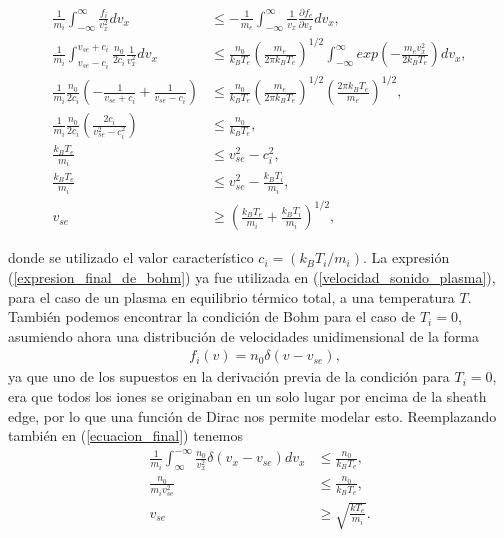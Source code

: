 \documentclass[../main.tex]{subfiles}
\begin{document}
{        \begin{align}
        \frac{1}{m_i} \int_{-\infty}^{\infty} \frac{f_i}{v_x^2}dv_x 
        &\leq  -\frac{1}{m_e} \int_{-\infty}^{\infty} \frac{1}{v_x}\frac{\partial f_e}{\partial v_x} dv_x, \\
        \frac{1}{m_i} \int_{v_{se}-c_i}^{v_{se}+c_i} \frac{n_0}{2c_i}\frac{1}{v_x^2}dv_x &\leq \frac{n_0}{k_BT_e}\left(\frac{m_e}{2\pi k_BT_e}\right)^{1/2}\int_{-\infty}^{\infty} exp\left(-\frac{m_ev_x^2}{2k_BT_e}\right) dv_x, \\
        \frac{1}{m_i} \frac{n_0}{2c_i}\left(-\frac{1}{v_{se}+c_i}+\frac{1}{v_{se}-c_i}\right) &\leq \frac{n_0}{k_BT_e}\left(\frac{m_e}{2\pi k_BT_e}\right)^{1/2}\left(\frac{2\pi k_BT_e}{m_e}\right)^{1/2}, \\
        \frac{1}{m_i} \frac{n_0}{2c_i}\left(\frac{2c_i}{v_{se}^2-c_i^2}\right) &\leq \frac{n_0}{k_BT_e}, \\
        \frac{k_BT_e}{m_i}  &\leq v_{se}^2-c_i^2, \\
        \frac{k_BT_e}{m_i}  &\leq v_{se}^2-\frac{k_BT_i}{m_i}, \\
        v_{se} &\geq \left(\frac{k_BT_e}{m_i} + \frac{k_BT_i}{m_i}\right)^{1/2}, \label{expresion_final_de_bohm}
    \end{align}
  
  donde se utilizado el valor característico $c_i = \left(k_BT_i/m_i\right)$. La expresión (\ref{expresion_final_de_bohm}) ya fue utilizada en (\ref{velocidad_sonido_plasma}), para el caso de un plasma en equilibrio térmico total, a una temperatura $T$. También podemos encontrar la condición de Bohm para el caso de $T_i = 0$, asumiendo ahora una distribución de velocidades unidimensional de la forma
    \begin{align}
        &f_i(v) = n_0\delta\left(v - v_{se} \right),
    \end{align}
   ya que uno de los supuestos en la derivación previa de la condición para $T_i=0$, era que todos los iones se originaban en un solo lugar por encima de la sheath edge, por lo que una función  de Dirac nos permite modelar esto. Reemplazando también en (\ref{ecuacion_final}) tenemos
   \begin{align}
       \frac{1}{m_i} \int_{\infty}^{-\infty} \frac{n_0}{v_x^2}\delta\left(v_x-v_{se}\right)dv_x 
        &\leq  \frac{n_0}{k_BT_e}, \\
        \frac{n_0}{m_iv_{se}^2}
        &\leq  \frac{n_0}{k_BT_e}, \\
        v_{se} &\geq \sqrt{\frac{kT_e}{m_i}}.
   \end{align}
   
}
\end{document}
